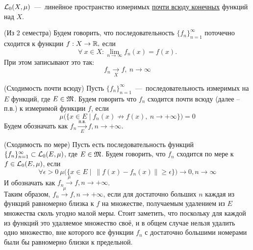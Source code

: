 \begin{definition}
    $\mathcal{L}_0(X, \mu)$~---~линейное пространство измеримых \underline{почти всюду конечных} функций над $X$.
\end{definition}

\begin{reminder} (Из 2 семестра)
    Будем говорить, что последовательность  $\{f_n\}_{n = 1}^\infty$ поточечно сходится к функции $f : X \rightarrow \mathbb{R},$ если
    $$\forall \ x \in X: \lim_{n \rightarrow \infty} f_n(x) = f(x).$$
    При этом записывают это так:
    $$f_n \underset{X}{\rightarrow} f, \ n\rightarrow \infty$$
\end{reminder}


\begin{definition} (Сходимость почти всюду)
    Пусть $\{f_n\}_{n = 1}^\infty$~---~последовательность измеримых на $E$ функций, где $E \in \mathfrak{M}$. Будем говорить что $f_n$ сходится почти всюду (далее -- п.в.) к измеримой функции $f$, если $$\mu\Big(\{x \in E \mid f_n(x) \not\rightarrow f(x), \ n \rightarrow +\infty\}\Big) = 0$$ Будем обозначать как $f_n \xrightarrow[E]{\text{п.в.}} f, n \rightarrow +\infty$.
\end{definition}

\begin{definition} (Сходимость по мере)
    Пусть есть последовательность функций $\{f_n\}_{n = 1}^\infty \subset \mathcal{L}_0(E, \mu)$, где $E \in \mathfrak{M}$. Будем говорить, что $f_n$ сходится по мере к $f \in \mathcal{L}_0(E, \mu)$, если $$\forall \epsilon > 0 \  \mu\Big(\{x \in E \mid \ \| f(x) - f_n(x)\| \geq \epsilon \}\Big) \xrightarrow{} 0, n \rightarrow \infty$$ И обозначать как $f_n \xrightarrow{\mu} f, n \rightarrow +\infty$. \\
    Таким образом, $f_n \xrightarrow{\mu} f, n \rightarrow +\infty$, если для достаточно больших $n$ каждая из функций равномерно близка к $f$ на множестве, получаемым удалением из $E$ множества сколь угодно малой меры. Стоит заметить, что поскольку для каждой из функций это удаляемое множество своё, и в общем случае нельзя удалить одно множество, вне которого все функции $f_n$ с достаточно большими номерами были бы равномерно близки к предельной.
\end{definition}

